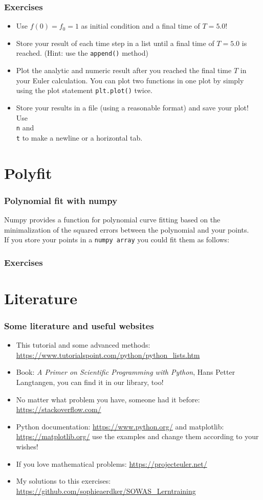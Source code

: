 \documentclass{beamer}
\begin{document}
\begin{frame}
\frametitle{Exercises}
	\begin{itemize}
		\item Use $f(0) = f_0 = 1$ as initial condition and a final time of $T = 5.0$!
		\item Store your result of each time step in a list until a final time of $T= 5.0$ is reached. (Hint: use the \texttt{append()} method)
		\item Plot the analytic and numeric result after you reached the final time $T$ in your Euler calculation. You can plot two functions in one plot by simply using the plot statement \texttt{plt.plot()} twice.
		\item Store your results in a file (using a reasonable format) and save your plot! Use \texttt{\\n} and \texttt{\\t} to make a newline or a horizontal tab.
		
	\end{itemize}
\end{frame}

\section{Polyfit}
\begin{frame}
\frametitle{Polynomial fit with numpy}
	Numpy provides a function for polynomial curve fitting based on the minimalization of the squared errors between the polynomial and your points. \\If you store your points in a \texttt{numpy array} you could fit them as follows:
\end{frame}

\begin{frame}
\frametitle{Exercises}

\end{frame}

\section{Literature}
\begin{frame}
\frametitle{Some literature and useful websites}
	\begin{itemize}
		\item This tutorial and some advanced methods: \url{https://www.tutorialspoint.com/python/python_lists.htm}
		\item Book: \textit{A Primer on Scientific Programming with Python}, Hans Petter Langtangen, you can find it in our library, too!
		\item No matter what problem you have, someone had it before: \url{https://stackoverflow.com/}
		\item Python documentation: \url{https://www.python.org/} and matplotlib: \url{https://matplotlib.org/} use the examples and change them according to your wishes!
		\item If you love mathematical problems: \url{https://projecteuler.net/}
		\item My solutions to this exercises: \url{https://github.com/sophieaerdker/SOWAS_Lerntraining}
	\end{itemize}
\end{frame}
\end{document}
